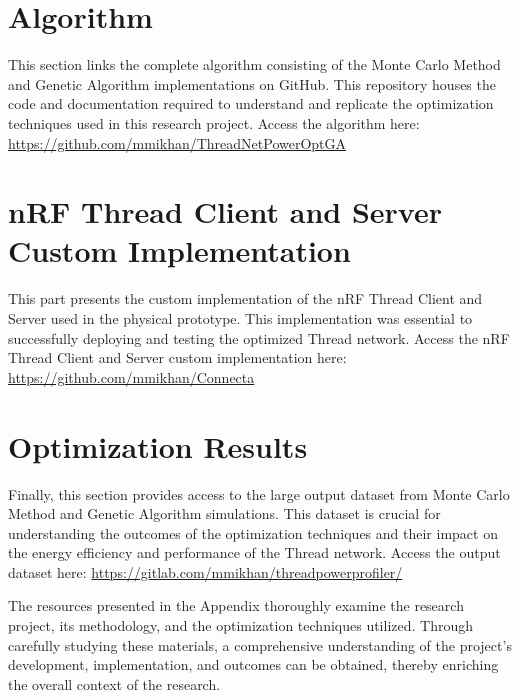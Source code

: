 \section{Algorithm}
This section links the complete algorithm consisting of the Monte Carlo Method and Genetic Algorithm implementations on GitHub. This repository houses the code and documentation required to understand and replicate the optimization techniques used in this research project. Access the algorithm here: \url{https://github.com/mmikhan/ThreadNetPowerOptGA}

\section{nRF Thread Client and Server Custom Implementation}
This part presents the custom implementation of the nRF Thread Client and Server used in the physical prototype. This implementation was essential to successfully deploying and testing the optimized Thread network. Access the nRF Thread Client and Server custom implementation here: \url{https://github.com/mmikhan/Connecta}

\section{Optimization Results}
Finally, this section provides access to the large output dataset from Monte Carlo Method and Genetic Algorithm simulations. This dataset is crucial for understanding the outcomes of the optimization techniques and their impact on the energy efficiency and performance of the Thread network. Access the output dataset here: \url{https://gitlab.com/mmikhan/threadpowerprofiler/}

\vspace{2mm}
The resources presented in the Appendix thoroughly examine the research project, its methodology, and the optimization techniques utilized. Through carefully studying these materials, a comprehensive understanding of the project's development, implementation, and outcomes can be obtained, thereby enriching the overall context of the research.


